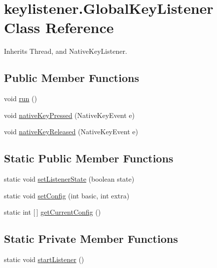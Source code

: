 \hypertarget{classkeylistener_1_1_global_key_listener}{}\section{keylistener.\+Global\+Key\+Listener Class Reference}
\label{classkeylistener_1_1_global_key_listener}


Inherits Thread, and Native\+Key\+Listener.

\subsection*{Public Member Functions}
\begin{DoxyCompactItemize}
\item 
void \hyperlink{classkeylistener_1_1_global_key_listener_a1311c34091f1d6faed3d75fb53b78190}{run} ()
\item 
void \hyperlink{classkeylistener_1_1_global_key_listener_a4e9b0fc264c36da46f6fea18f066e350}{native\+Key\+Pressed} (Native\+Key\+Event e)
\item 
void \hyperlink{classkeylistener_1_1_global_key_listener_acdfabb2da1c1a0e1eac2cdf1aa4aef7d}{native\+Key\+Released} (Native\+Key\+Event e)
\end{DoxyCompactItemize}
\subsection*{Static Public Member Functions}
\begin{DoxyCompactItemize}
\item 
static void \hyperlink{classkeylistener_1_1_global_key_listener_ac7791cb094144696ec7d2353918a4a3d}{set\+Listener\+State} (boolean state)
\item 
static void \hyperlink{classkeylistener_1_1_global_key_listener_af914f52abd190712aea1a285979aa4cb}{set\+Config} (int basic, int extra)
\item 
static int \mbox{[}$\,$\mbox{]} \hyperlink{classkeylistener_1_1_global_key_listener_af81aa4005a7d48056b73b3934f805668}{get\+Current\+Config} ()
\end{DoxyCompactItemize}
\subsection*{Static Private Member Functions}
\begin{DoxyCompactItemize}
\item 
static void \hyperlink{classkeylistener_1_1_global_key_listener_ad66ec63997ce4dc870c9aedf34bb4b9a}{start\+Listener} ()
\end{DoxyCompactItemize}



